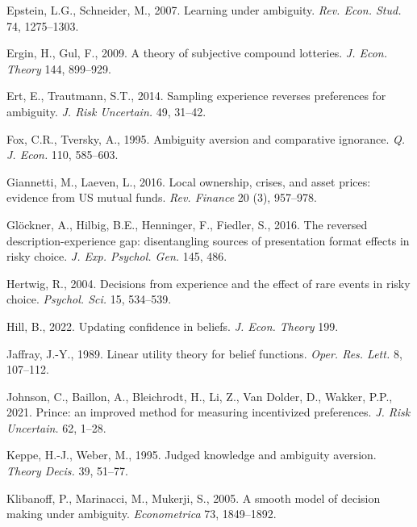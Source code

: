 \documentclass[12pt,a4paper]{article}
\newenvironment{original}
  {\par\vspace{0.5em}\noindent\color{black}\ignorespaces}
  {\par\vspace{0.3em}}
\begin{document}
\begin{original}
\vspace{0.3em}
\noindent Epstein, L.G., Schneider, M., 2007. Learning under ambiguity. \textit{Rev. Econ. Stud.} 74, 1275--1303.

\vspace{0.3em}
\noindent Ergin, H., Gul, F., 2009. A theory of subjective compound lotteries. \textit{J. Econ. Theory} 144, 899--929.

\vspace{0.3em}
\noindent Ert, E., Trautmann, S.T., 2014. Sampling experience reverses preferences for ambiguity. \textit{J. Risk Uncertain.} 49, 31--42.

\vspace{0.3em}
\noindent Fox, C.R., Tversky, A., 1995. Ambiguity aversion and comparative ignorance. \textit{Q. J. Econ.} 110, 585--603.

\vspace{0.3em}
\noindent Giannetti, M., Laeven, L., 2016. Local ownership, crises, and asset prices: evidence from US mutual funds. \textit{Rev. Finance} 20 (3), 957--978.

\vspace{0.3em}
\noindent Gl\"{o}ckner, A., Hilbig, B.E., Henninger, F., Fiedler, S., 2016. The reversed description-experience gap: disentangling sources of presentation format effects in risky choice. \textit{J. Exp. Psychol. Gen.} 145, 486.

\vspace{0.3em}
\noindent Hertwig, R., 2004. Decisions from experience and the effect of rare events in risky choice. \textit{Psychol. Sci.} 15, 534--539.

\vspace{0.3em}
\noindent Hill, B., 2022. Updating confidence in beliefs. \textit{J. Econ. Theory} 199.

\vspace{0.3em}
\noindent Jaffray, J.-Y., 1989. Linear utility theory for belief functions. \textit{Oper. Res. Lett.} 8, 107--112.

\vspace{0.3em}
\noindent Johnson, C., Baillon, A., Bleichrodt, H., Li, Z., Van Dolder, D., Wakker, P.P., 2021. Prince: an improved method for measuring incentivized preferences. \textit{J. Risk Uncertain.} 62, 1--28.

\vspace{0.3em}
\noindent Keppe, H.-J., Weber, M., 1995. Judged knowledge and ambiguity aversion. \textit{Theory Decis.} 39, 51--77.

\vspace{0.3em}
\noindent Klibanoff, P., Marinacci, M., Mukerji, S., 2005. A smooth model of decision making under ambiguity. \textit{Econometrica} 73, 1849--1892.


\end{original}
\end{document}
